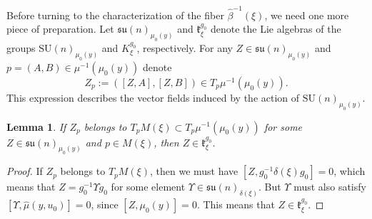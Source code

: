 \documentclass[a4paper,11pt,reqno]{amsart}
\newtheorem{lem}[thm]{Lemma}
\theoremstyle{definition}
\numberwithin{equation}{section}
\newcommand{\be}{\begin{equation}}
\newcommand{\ee}{\end{equation}}
\def\SU{\mathrm{SU}}                        %
\def\su{{\mathfrak{su}}}                    %
\def\k{{\mathfrak k}}                       %
\begin{document}
Before turning to the characterization of the fiber $\hat \beta^{-1}(\xi)$, we need one more piece of preparation.
Let
$\su(n)_{\mu_0(y)}$ and $\k_\xi^{g_0}$ denote the Lie algebras of the groups $\SU(n)_{\mu_0(y)}$ and $K_\xi^{g_0}$, respectively.
For any $Z \in \su(n)_{\mu_0(y)}$ and $p = (A,B) \in \mu^{-1}(\mu_0(y))$ denote
\be
Z_p := ([Z,A], [Z,B]) \in T_p \mu^{-1}(\mu_0(y)).
\label{B12}\ee
This expression describes the vector fields induced by the action of $\SU(n)_{\mu_0(y)}$.

\begin{lem}\label{lem312}
If $Z_p$ belongs to $T_p M(\xi)\subset T_p \mu^{-1}(\mu_0(y))$ for
some $Z\in \su(n)_{\mu_0(y)}$ and $p\in M(\xi)$, then $Z \in \k_\xi^{g_0}$.
\end{lem}    \begin{proof}
If $Z_p$ belongs to $T_p M(\xi)$, then we must have $[Z,g_0^{-1} \delta(\xi) g_0]=0$, which means that
$Z = g_0^{-1} \Upsilon g_0$ for some element $\Upsilon \in \su(n)_{\delta(\xi)}$. But $\Upsilon$ must
also satisfy $[\Upsilon, \hat \mu(y,u_0)]=0$,
since $[Z,   \mu_0(y)] =0$. This means that $Z \in \k_\xi^{g_0}$.
\end{proof}
\end{document}
